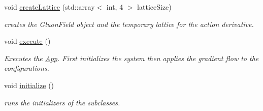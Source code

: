\begin{DoxyCompactItemize}
\item 
void \hyperlink{classWilsonFlow_a1ae84f31a7b54b423bbe1d76001468d1}{create\+Lattice} (std\+::array$<$ int, 4 $>$ lattice\+Size)\hypertarget{classWilsonFlow_a1ae84f31a7b54b423bbe1d76001468d1}{}\label{classWilsonFlow_a1ae84f31a7b54b423bbe1d76001468d1}

\begin{DoxyCompactList}\small\item\em creates the Gluon\+Field object and the temporary lattice for the action derivative. \end{DoxyCompactList}\item 
void \hyperlink{classWilsonFlow_a300944faffcb90c69ba9e2b62fd31561}{execute} ()\hypertarget{classWilsonFlow_a300944faffcb90c69ba9e2b62fd31561}{}\label{classWilsonFlow_a300944faffcb90c69ba9e2b62fd31561}

\begin{DoxyCompactList}\small\item\em Executes the \hyperlink{classApp}{App}. First initializes the system then applies the gradient flow to the configurations. \end{DoxyCompactList}\item 
void \hyperlink{classWilsonFlow_afc84f29eab27e12f9ff51417dd6cf984}{initialize} ()\hypertarget{classWilsonFlow_afc84f29eab27e12f9ff51417dd6cf984}{}\label{classWilsonFlow_afc84f29eab27e12f9ff51417dd6cf984}

\begin{DoxyCompactList}\small\item\em runs the initializers of the subclasses. \end{DoxyCompactList}\end{DoxyCompactItemize}
